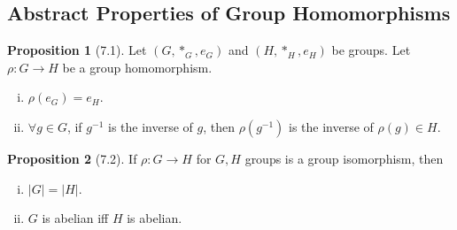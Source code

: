 \documentclass{article}
\newcommand{\func}[3]{\ensuremath{#1: #2 \to #3}}
\theoremstyle{definition}
\newtheorem*{prop}{Proposition}
\theoremstyle{remark}
\begin{document}
{        \subsection*{Abstract Properties of Group Homomorphisms}{
            \begin{prop}[7.1]
                Let $(G, *_G, e_G)$ and $(H, *_H, e_H)$ be groups. Let $\func{\rho}{G}{H}$ be a group homomorphism.
                \begin{enumerate}[i.]
                    \item $\rho(e_G)=e_H$.
                    \item $\forall g \in G$, if $g^{-1}$ is the inverse of $g$, then $\rho(g^{-1})$ is the inverse of $\rho(g) \in H$.
                \end{enumerate}
            \end{prop}
            
            \begin{prop}[7.2]
                If $\func{\rho}{G}{H}$ for $G, H$ groups is a group isomorphism, then
                \begin{enumerate}[i.]
                    \item $|G|=|H|$.
                    \item $G$ is abelian iff $H$ is abelian.
                \end{enumerate}
            \end{prop}
        
        }
    
    
    }
\end{document}
